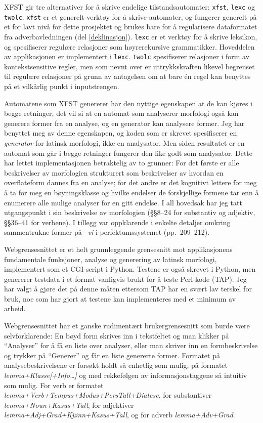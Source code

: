 \documentclass{article}
\let\form\emph
\let\prog\texttt
\let\w\emph
\begin{document}
XFST gir tre alternativer for \aa{} skrive endelige tilstandsautomater:
\prog{xfst}, \prog{lexc} og \prog{twolc}. \prog{xfst} er et generelt
verkt\o{}y for \aa{} skrive automater, og fungerer generelt p\aa{} et for lavt
niv\aa{} for dette prosjektet og brukes bare for \aa{} regularisere
dataformatet fra adverbavledningen (del \ref{deklinasjon}). \prog{lexc} er et
verkt\o{}y for \aa{} skrive leksikon, og spesifiserer regul\ae{}re relasjoner
som h\o{}yrerekursive grammatikker. Hoveddelen av applikasjonen er
implementert i \prog{lexc}. \prog{twolc} spesifiserer relasjoner i form av
kontekstsensitive regler, men som nevnt over er uttrykkskraften likevel
begrenset til regul\ae{}re relasjoner p\aa{} grunn av antagelsen om at bare
\'en regel kan benyttes p\aa{} et vilk\aa{}rlig punkt i inputstrengen.
\cite{xfst,twolc}

Automatene som XFST genererer har den nyttige egenskapen at de kan kj\o{}res i
begge retninger, det vil si at en automat som analyserer morfologi ogs\aa{}
kan generere former fra en analyse, og en generator kan analysere former. Jeg
har benyttet meg av denne egenskapen, og koden som er skrevet spesifiserer en
\emph{generator} for latinsk morfologi, ikke en analysator. Men siden
resultatet er en automat som g\aa{}r i begge retninger fungerer den like godt
som analysator. Dette har lettet implementasjonen betraktelig av to grunner:
For det f\o{}rste er alle beskrivelser av morfologien strukturert som
beskrivelser av hvordan en overflateform dannes fra en analyse; for det andre
er det kognitivt lettere for meg \aa{} ta for meg en b\o{}yningsklasse og
hvilke endelser de forskjellige formene tar enn \aa{} enumerere alle mulige
analyser for en gitt endelse. I all hovedsak har jeg tatt utgangspunkt i
 sin beskrivelse av morfologien (\S\S 8--24 for substantiv og
adjektiv, \S\S 36--41 for verbene). I tillegg var  oppklarende i
enkelte detaljer omkring sammentrukne former p\aa{} \w{--vi} i
perfektumssystemet (pp.~209--212).

Webgrensesnittet er et helt grunnleggende grensesnitt mot applikasjonens
fundamentale funksjoner, analyse og generering av latinsk morfologi,
implementert som et CGI-script i Python. Testene er ogs\aa{} skrevet i Python,
men genererer testdata i et format vanligvis brukt for \aa{} teste Perl-kode
(TAP). Jeg har valgt \aa{} gj\o{}re det p\aa{} denne m\aa{}ten ettersom TAP
har en sv\ae{}rt lav terskel for bruk, noe som har gjort at testene kan
implementeres med et minimum av arbeid.

Webgrensesnittet har et ganske rudiment\ae{}rt brukergrensesnitt som burde
v\ae{}re selvforklarende: En b\o{}yd form skrives inn i tekstfeltet og man
klikker p\aa{} ``Analyser'' for \aa{} f\aa{} en liste over analyser, eller man
skriver inn en formbeskrivelse og trykker p\aa{} ``Generer'' og f\aa{}r en
liste genererte former. Formatet p\aa{} analysebeskrivelsene er fors\o{}kt
holdt s\aa{} enhetlig som mulig, p\aa{} formatet
\form{lemma+Klasse[+Info\ldots]} og med rekkef\o{}lgen av informasjonstaggene
s\aa{} intuitiv som mulig. For verb er formatet
\form{lemma+Verb+Tempus+Modus+PersTall+Diatese}, for substantiver
\form{lemma\-+Noun\-+Kasus\-+Tall}, for adjektiver
\form{lemma\-+Adj\-+Grad\-+Kj\o{}nn\-+Kasus\-+Tall}, og for adverb
\form{lemma+Adv+Grad}.
\end{document}
